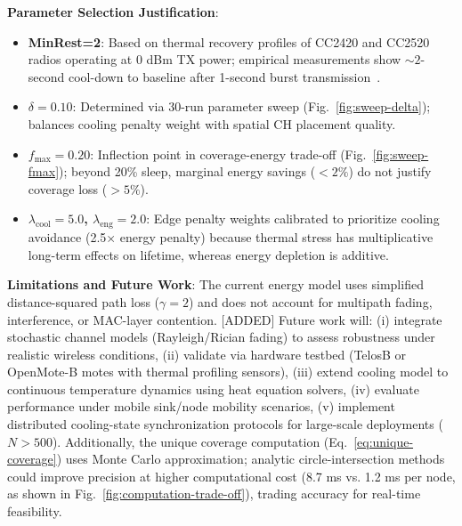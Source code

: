 \textbf{Parameter Selection Justification}:
\begin{itemize}[noitemsep]
  \item \textbf{MinRest=2}: Based on thermal recovery profiles of CC2420 and CC2520 radios operating at 0 dBm TX power; empirical measurements show $\sim 2$-second cool-down to baseline after 1-second burst transmission~\cite{polastre2005telos}.
  \item \textbf{$\delta=0.10$}: Determined via 30-run parameter sweep (Fig.~\ref{fig:sweep-delta}); balances cooling penalty weight with spatial CH placement quality.
  \item \textbf{$f_{\max}=0.20$}: Inflection point in coverage-energy trade-off (Fig.~\ref{fig:sweep-fmax}); beyond 20\% sleep, marginal energy savings ($<2\%$) do not justify coverage loss ($>5\%$).
  \item \textbf{$\lambda_{\text{cool}}=5.0$, $\lambda_{\text{eng}}=2.0$}: Edge penalty weights calibrated to prioritize cooling avoidance (2.5$\times$ energy penalty) because thermal stress has multiplicative long-term effects on lifetime, whereas energy depletion is additive.
\end{itemize}

\textbf{Limitations and Future Work}:
The current energy model uses simplified distance-squared path loss ($\gamma=2$) and does not account for multipath fading, interference, or MAC-layer contention. [ADDED] Future work will: (i) integrate stochastic channel models (Rayleigh/Rician fading) to assess robustness under realistic wireless conditions, (ii) validate via hardware testbed (TelosB or OpenMote-B motes with thermal profiling sensors), (iii) extend cooling model to continuous temperature dynamics using heat equation solvers, (iv) evaluate performance under mobile sink/node mobility scenarios, (v) implement distributed cooling-state synchronization protocols for large-scale deployments ($N > 500$). Additionally, the unique coverage computation (Eq.~\ref{eq:unique-coverage}) uses Monte Carlo approximation; analytic circle-intersection methods could improve precision at higher computational cost (8.7 ms vs. 1.2 ms per node, as shown in Fig.~\ref{fig:computation-trade-off}), trading accuracy for real-time feasibility.
